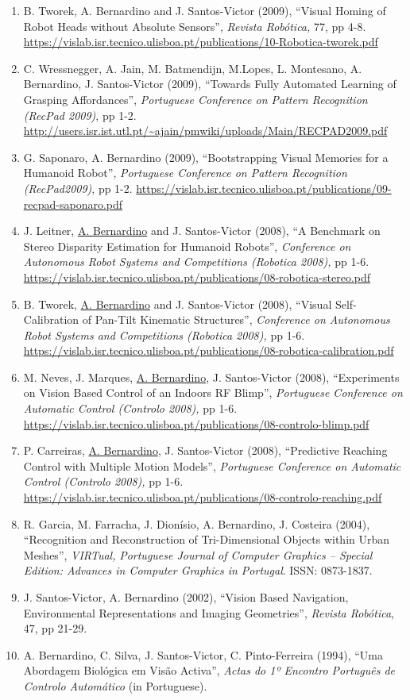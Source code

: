 \begin{enumerate}
{  on Pattern Recognition (RecPad 2010)}, pp 1-2.
  \url{https://vislab.isr.tecnico.ulisboa.pt/publications/10-RecPad-RGalego.pdf}
\item
  B. Tworek, A. Bernardino and J. Santos-Victor (2009), ``Visual Homing
  of Robot Heads without Absolute Sensors'', \emph{Revista Robótica,}
  77, pp 4-8.
  \url{https://vislab.isr.tecnico.ulisboa.pt/publications/10-Robotica-tworek.pdf}
\item
  C. Wressnegger, A. Jain, M. Batmendijn, M.Lopes, L. Montesano, A.
  Bernardino, J. Santos-Victor (2009), ``Towards Fully Automated
  Learning of Grasping Affordances'', \emph{Portuguese Conference on
  Pattern Recognition (RecPad 2009)}, pp 1-2.
  \url{http://users.isr.ist.utl.pt/~ajain/pmwiki/uploads/Main/RECPAD2009.pdf}
\item
  G. Saponaro, A. Bernardino (2009), ``Bootstrapping Visual Memories for
  a Humanoid Robot'', \emph{Portuguese Conference on Pattern Recognition
  (RecPad2009)}, pp 1-2.
  \url{https://vislab.isr.tecnico.ulisboa.pt/publications/09-recpad-saponaro.pdf}
\item
  J. Leitner, \ul{A. Bernardino} and J. Santos-Victor (2008), ``A
  Benchmark on Stereo Disparity Estimation for Humanoid Robots'',
  \emph{Conference on Autonomous Robot Systems and Competitions
  (Robotica 2008),} pp 1-6.
  \url{https://vislab.isr.tecnico.ulisboa.pt/publications/08-robotica-stereo.pdf}~
\item
  B. Tworek, \ul{A. Bernardino} and J. Santos-Victor (2008), ``Visual
  Self-Calibration of Pan-Tilt Kinematic Structures'', \emph{Conference
  on Autonomous Robot Systems and Competitions (Robotica 2008),} pp 1-6.
  \url{https://vislab.isr.tecnico.ulisboa.pt/publications/08-robotica-calibration.pdf}~
\item
  M. Neves, J. Marques, \ul{A. Bernardino}, J. Santos-Victor (2008),
  ``Experiments on Vision Based Control of an Indoors RF Blimp'',
  \emph{Portuguese Conference on Automatic Control (Controlo 2008),} pp
  1-6.
  \url{https://vislab.isr.tecnico.ulisboa.pt/publications/08-controlo-blimp.pdf}~
\item
  P. Carreiras, \ul{A. Bernardino}, J. Santos-Victor (2008),
  ``Predictive Reaching Control with Multiple Motion Models'',
  \emph{Portuguese Conference on Automatic Control (Controlo 2008),} pp
  1-6.
  \url{https://vislab.isr.tecnico.ulisboa.pt/publications/08-controlo-reaching.pdf}
\item
  R. Garcia, M. Farracha, J. Dionísio, A. Bernardino, J. Costeira
  (2004), ``Recognition and Reconstruction of Tri-Dimensional Objects
  within Urban Meshes'', \emph{VIRTual,} \emph{Portuguese Journal of
  Computer Graphics -- Special Edition: Advances in Computer Graphics in
  Portugal}. ISSN: 0873-1837.
\item
  J. Santos-Victor, A. Bernardino (2002), ``Vision Based Navigation,
  Environmental Representations and Imaging Geometries'', \emph{Revista
  Robótica}, 47, pp 21-29.
\item
  A. Bernardino, C. Silva, J. Santos-Victor, C. Pinto-Ferreira (1994),
  ``Uma Abordagem Biológica em Visão Activa'', \emph{Actas do 1º
  Encontro Português de Controlo Automático} (in Portuguese).
\end{enumerate}

